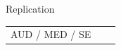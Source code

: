 \documentclass[final]{beamer}
\begin{document}
\begin{frame}{}
\begin{textblock}{67}
\begin{block}{Replication}
\begin{tabular}{c c c}
 AUD / MED / SE
\end{tabular}
\end{block}
\end{textblock}
\end{frame}
\end{document}
